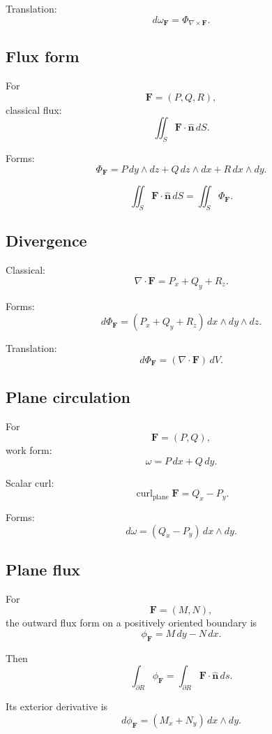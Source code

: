 Translation:
\[
\boxed{
    d\omega_{\mathbf F}
    =
    \Phi_{\nabla\times\mathbf F}.
}
\]

\subsection*{Flux form}

For
\[
    \mathbf F=(P,Q,R),
\]
classical flux:
\[
\boxed{
    \iint_S \mathbf F\cdot\widehat{\mathbf n}\,dS.
}
\]

Forms:
\[
\boxed{
    \Phi_{\mathbf F}
    =
    P\,dy\wedge dz
    +
    Q\,dz\wedge dx
    +
    R\,dx\wedge dy.
}
\]

\[
\boxed{
    \iint_S \mathbf F\cdot\widehat{\mathbf n}\,dS
    =
    \iint_S \Phi_{\mathbf F}.
}
\]

\subsection*{Divergence}

Classical:
\[
\boxed{
    \nabla\cdot\mathbf F=P_x+Q_y+R_z.
}
\]

Forms:
\[
\boxed{
    d\Phi_{\mathbf F}
    =
    (P_x+Q_y+R_z)\,dx\wedge dy\wedge dz.
}
\]

Translation:
\[
\boxed{
    d\Phi_{\mathbf F}
    =
    (\nabla\cdot\mathbf F)\,dV.
}
\]

\subsection*{Plane circulation}

For
\[
    \mathbf F=(P,Q),
\]
work form:
\[
\boxed{
    \omega=P\,dx+Q\,dy.
}
\]

Scalar curl:
\[
\boxed{
    \operatorname{curl}_{\mathrm{plane}}\mathbf F=Q_x-P_y.
}
\]

Forms:
\[
\boxed{
    d\omega=(Q_x-P_y)\,dx\wedge dy.
}
\]

\subsection*{Plane flux}

For
\[
    \mathbf F=(M,N),
\]
the outward flux form on a positively oriented boundary is
\[
\boxed{
    \phi_{\mathbf F}=M\,dy-N\,dx.
}
\]

Then
\[
\boxed{
    \int_{\partial R}\phi_{\mathbf F}
    =
    \int_{\partial R}\mathbf F\cdot\widehat{\mathbf n}\,ds.
}
\]

Its exterior derivative is
\[
\boxed{
    d\phi_{\mathbf F}
    =
    (M_x+N_y)\,dx\wedge dy.
}
\]

